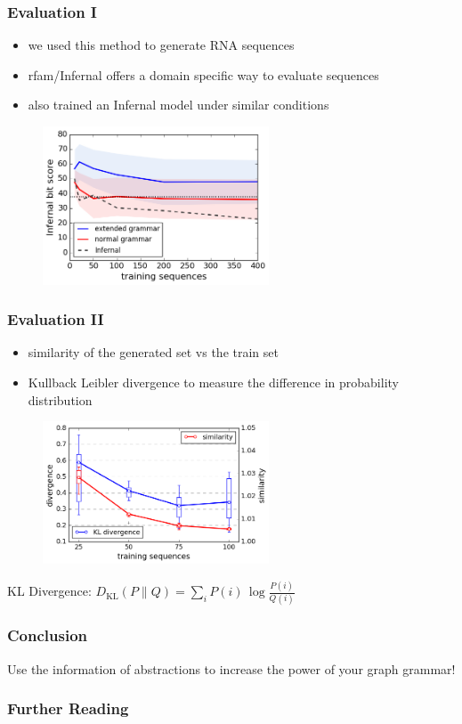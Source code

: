 \documentclass{beamer}
\begin{document}
\begin{frame}
    \frametitle{Evaluation I}
    \begin{itemize}
        \item we used this method to generate RNA sequences
        \item rfam/Infernal offers a domain specific  way to evaluate sequences
        \item also trained an Infernal model under similar conditions
    \end{itemize}

   \begin{figure}[ht]
        \centering
        \includegraphics[width=0.60\textwidth]{images/infernal_abstr.png}
    \end{figure}
\end{frame}

\begin{frame}
    \frametitle{Evaluation II}
    
    \begin{itemize}
        \item similarity of the generated set vs the train set
        \item Kullback Leibler divergence to measure the difference in probability distribution
    \end{itemize}
   \begin{figure}[ht]
        \centering
        \includegraphics[width=0.6\textwidth]{images/learningcurve.png}
    \end{figure}
    \tiny{KL Divergence:  $D_{\mathrm{KL}}(P\|Q) = \sum_i P(i) \, \log\frac{P(i)}{Q(i)}$ }
\end{frame}

\begin{frame}
    \frametitle{Conclusion}
        Use the information of abstractions
        to increase the power of your graph grammar!
\end{frame}
\begin{frame}
    \frametitle{Further Reading}

\end{frame}
\end{document}
